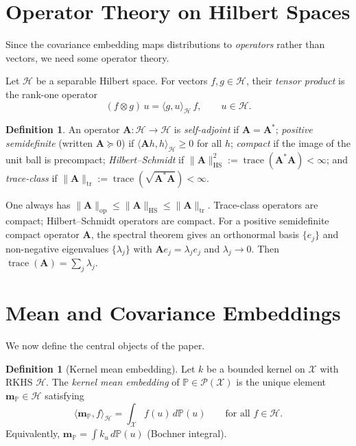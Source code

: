 \documentclass[12pt, oneside]{book}
\theoremstyle{plain}
\theoremstyle{definition}
\newtheorem{definition}[theorem]{Definition}
\newcommand{\calH}{\mathcal{H}}
\newcommand{\calX}{\mathcal{X}}
\newcommand{\calP}{\mathcal{P}}
\newcommand{\PP}{\mathbb{P}}
\newcommand{\HS}{\mathrm{HS}}
\newcommand{\tr}{\mathrm{tr}}
\newcommand{\op}{\mathrm{op}}
\newcommand{\mP}{\mathbf{m}_{\PP}}
\renewcommand{\leq}{\leqslant}
\renewcommand{\geq}{\geqslant}
\DeclareMathOperator{\trace}{trace}
\begin{document}
\section{Operator Theory on Hilbert Spaces}

Since the covariance embedding maps distributions to \emph{operators} rather than vectors, we need some operator theory.

Let $\calH$ be a separable Hilbert space. For vectors $f, g \in \calH$, their \emph{tensor product} is the rank-one operator
\begin{equation}
(f \otimes g)\, u = \langle g, u \rangle_{\calH}\, f, \qquad u \in \calH.
\end{equation}

\begin{definition}
An operator $\mathbf{A}: \calH \to \calH$ is \emph{self-adjoint} if $\mathbf{A} = \mathbf{A}^*$; \emph{positive semidefinite} (written $\mathbf{A} \succeq 0$) if $\langle \mathbf{A}h, h \rangle_{\calH} \geq 0$ for all $h$; \emph{compact} if the image of the unit ball is precompact; \emph{Hilbert--Schmidt} if $\|\mathbf{A}\|_{\HS}^2 := \trace(\mathbf{A}^* \mathbf{A}) < \infty$; and \emph{trace-class} if $\|\mathbf{A}\|_{\tr} := \trace(\sqrt{\mathbf{A}^* \mathbf{A}}) < \infty$.
\end{definition}

One always has $\|\mathbf{A}\|_{\op} \leq \|\mathbf{A}\|_{\HS} \leq \|\mathbf{A}\|_{\tr}$. Trace-class operators are compact; Hilbert--Schmidt operators are compact. For a positive semidefinite compact operator $\mathbf{A}$, the spectral theorem gives an orthonormal basis $\{e_j\}$ and non-negative eigenvalues $\{\lambda_j\}$ with $\mathbf{A}e_j = \lambda_j e_j$ and $\lambda_j \to 0$. Then $\trace(\mathbf{A}) = \sum_j \lambda_j$.

\section{Mean and Covariance Embeddings}

We now define the central objects of the paper.

\begin{definition}[Kernel mean embedding]
Let $k$ be a bounded kernel on $\calX$ with RKHS $\calH$. The \emph{kernel mean embedding} of $\PP \in \calP(\calX)$ is the unique element $\mP \in \calH$ satisfying
\begin{equation}
\langle \mP, f \rangle_{\calH} = \int_{\calX} f(u)\, d\PP(u) \qquad \text{for all } f \in \calH.
\end{equation}
Equivalently, $\mP = \int k_u\, d\PP(u)$ (Bochner integral).
\end{definition}
\end{document}
